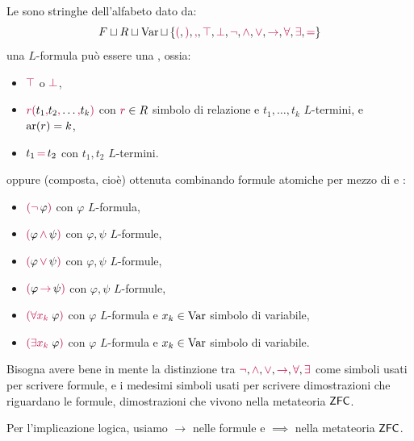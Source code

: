 \begin{definition}
    [$L$-formula]
    Le  sono stringhe dell'alfabeto dato da:
    \[ F \sqcup R \sqcup \operatorname{Var}\sqcup \,\{\textcolor{purple}{(}, \textcolor{purple}{)}, \textcolor{purple}{,}, \textcolor{purple}{\top}, \textcolor{purple}{\bot}, \textcolor{purple}{\neg}, \textcolor{purple}{\land}, \textcolor{purple}{\lor}, \textcolor{purple}{\to}, \textcolor{purple}{\forall}, \textcolor{purple}{\exists}, \textcolor{purple}{=}\}
    \]
    una $L$-formula può essere una , ossia:
    \begin{itemize}
        \item $\textcolor{purple}{\top}$ o $\textcolor{purple}{\bot}$,
        \item $\textcolor{purple}{r(} t_1\textcolor{purple}{,} t_2\textcolor{purple}{,} \ldots\textcolor{purple}{,} t_k\textcolor{purple}{)}$ con $\textcolor{purple}{r} \in R$ simbolo di relazione e $t_1,\ldots,t_k$ $L$-termini, e $\operatorname{ar}(r) = k$,
        \item $t_1\, \textcolor{purple}{=}\, t_2$ con $t_1,t_2$ $L$-termini. 
    \end{itemize}
    oppure (composta, cioè) ottenuta combinando formule atomiche per mezzo di  e :
    \begin{itemize}
        \item $\textcolor{purple}{(\neg\,} \varphi\textcolor{purple}{)}$ con $\varphi$ $L$-formula,
        \item $\textcolor{purple}{(} \varphi \,\textcolor{purple}{\land}\, \psi\textcolor{purple}{)}$ con $\varphi,\psi$ $L$-formule,
        \item $\textcolor{purple}{(} \varphi \,\textcolor{purple}{\lor}\, \psi\textcolor{purple}{)}$ con $\varphi,\psi$ $L$-formule,
        \item $\textcolor{purple}{(} \varphi \,\textcolor{purple}{\to}\, \psi\textcolor{purple}{)}$ con $\varphi,\psi$ $L$-formule,
        \item $\textcolor{purple}{(\forall x_k} \;\varphi\textcolor{purple}{)}$ con $\varphi$ $L$-formula e $x_k \in \operatorname{Var}$ simbolo di variabile,
        \item $\textcolor{purple}{(\exists x_k} \;\varphi\textcolor{purple}{)}$ con $\varphi$ $L$-formula e $x_k \in \operatorname{Var}$ simbolo di variabile.
    \end{itemize}
\end{definition}

\begin{note}
    Bisogna avere bene in mente la distinzione tra $\textcolor{purple}{\neg},\textcolor{purple}{\land},\textcolor{purple}{\lor},\textcolor{purple}{\to}, \textcolor{purple}{\forall}, \textcolor{purple}{\exists}$ come simboli usati per scrivere formule, e i medesimi simboli usati per scrivere dimostrazioni che riguardano le formule, dimostrazioni che vivono nella metateoria $\sf ZFC$. 
    
    Per l'implicazione logica, usiamo $\to$ nelle formule e $\implies$ nella metateoria $\sf ZFC$.
\end{note}

